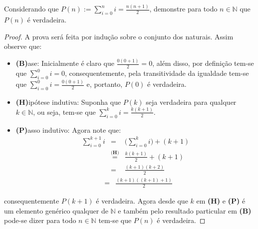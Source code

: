 \begin{exemplo}\label{exe:InducaoFraca3}
	Considerando que $\displaystyle P(n) := \sum_{i = 0}^{n} i = \frac{n(n+1)}{2}$, demonstre para todo $n \in \mathbb{N}$ que $P(n)$ é verdadeira.
	
	\begin{proof}
		A prova será feita por indução sobre o conjunto dos naturais. Assim observe que:
		\begin{itemize}
			\item[ ] \textbf{(B)}ase: Inicialmente é claro que $\frac{0(0+1)}{2} = 0$, além disso, por definição tem-se que $\displaystyle \sum_{i=0}^{0} i = 0$, consequentemente, pela transitividade da igualdade tem-se que  $\displaystyle\sum_{i = 0}^{0} i = \frac{0(0+1)}{2}$ e, portanto, $P(0)$ é verdadeira.
			\item[ ] \textbf{(H)}ipótese indutiva: Suponha que $P(k)$ seja verdadeira para qualquer $k \in \mathbb{N}$, ou seja, tem-se que $\displaystyle\sum_{i = 0}^{k} i = \frac{k(k+1)}{2}$.
			\item[ ] \textbf{(P)}asso indutivo:  Agora note que:
			\begin{eqnarray*}
				\sum_{i = 0}^{k+1} i & = & \Big(\sum_{i = 0}^{k} i\Big) + (k+1)\\
				& \stackrel{\textbf{(H)}}{=} & \frac{k(k+1)}{2} + (k+1)\\
        & = & \frac{(k+1)(k + 2)}{2}
      \end{eqnarray*}
      \begin{eqnarray*}
				& = & \frac{(k+1)((k+1) + 1)}{2}
			\end{eqnarray*}
		\end{itemize}
		consequentemente $P(k + 1)$ é verdadeira. Agora desde que $k$ em \textbf{(H)} e \textbf{(P)} é um elemento genérico qualquer de $\mathbb{N}$ e também pelo resultado particular em  \textbf{(B)} pode-se dizer para todo $n \in \mathbb{N}$ tem-se que $P(n)$ é verdadeira.
	\end{proof}
\end{exemplo}

